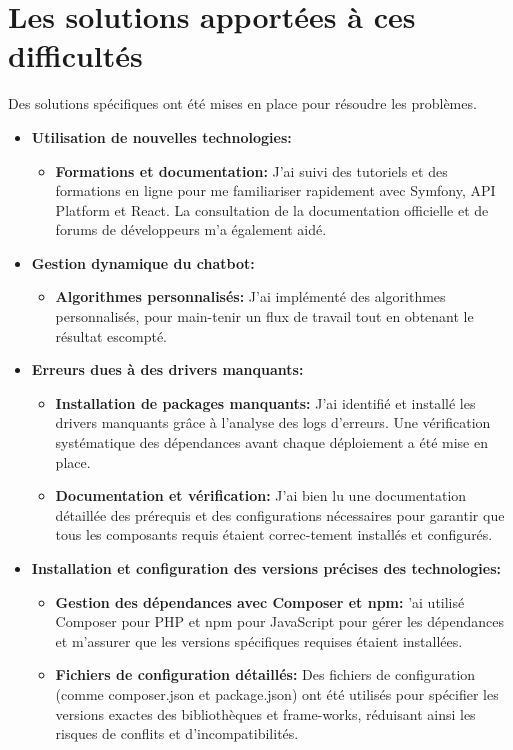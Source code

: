 \section{Les solutions apportées à ces difficultés}

\hspace{16pt}Des solutions spécifiques ont été mises en place pour résoudre les problèmes.

\begin{itemize}
  \item \textbf{Utilisation de nouvelles technologies: }
    \begin{itemize}
      \item \textbf{Formations et documentation: }J'ai suivi des tutoriels et des formations en ligne pour me familiariser rapidement avec Symfony, API Platform et React. La consultation de la documentation officielle et de forums de développeurs m'a également aidé.
    \end{itemize}
  \item \textbf{Gestion dynamique du chatbot: }
    \begin{itemize}
      \item \textbf{Algorithmes personnalisés: }J'ai implémenté des algorithmes personnalisés, pour main-tenir un flux de travail tout en obtenant le résultat escompté.
    \end{itemize}
  \item \textbf{Erreurs dues à des drivers manquants: }
    \begin{itemize}
      \item \textbf{Installation de packages manquants: }J'ai identifié et installé les drivers manquants grâce à l'analyse des logs d'erreurs. Une vérification systématique des dépendances avant chaque déploiement a été mise en place.
      \item \textbf{Documentation et vérification: }J'ai bien lu une documentation détaillée des prérequis et des configurations nécessaires pour garantir que tous les composants requis étaient correc-tement installés et configurés.
    \end{itemize}
  \item \textbf{Installation et configuration des versions précises des technologies: }
    \begin{itemize}
      \item \textbf{Gestion des dépendances avec Composer et npm: }'ai utilisé Composer pour PHP et npm pour JavaScript pour gérer les dépendances et m'assurer que les versions spécifiques requises étaient installées.
      \item \textbf{Fichiers de configuration détaillés: }Des fichiers de configuration (comme composer.json et package.json) ont été utilisés pour spécifier les versions exactes des bibliothèques et frame-works, réduisant ainsi les risques de conflits et d'incompatibilités.
    \end{itemize}
\end{itemize}


